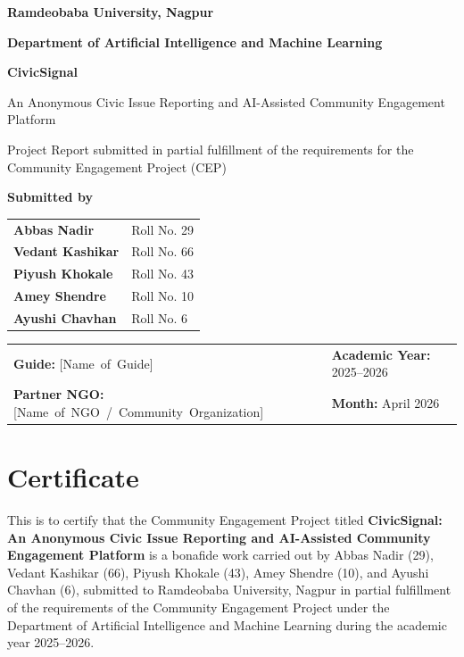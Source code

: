 \documentclass[12pt,a4paper]{report}
\newcommand{\projecttitle}{CivicSignal: An Anonymous Civic Issue Reporting and AI-Assisted Community Engagement Platform}
\newcommand{\departmentname}{Department of Artificial Intelligence and Machine Learning}
\newcommand{\institutionname}{Ramdeobaba University, Nagpur}
\newcommand{\academicyear}{2025--2026}
\newcommand{\reportmonth}{April 2026}
\begin{document}
\begin{titlepage}
  \centering
  {\Large \textbf{\institutionname} \par}
  \vspace{0.4cm}
  {\large \textbf{\departmentname} \par}
  \vspace{1.8cm}
  {\Huge \textbf{CivicSignal} \par}
  \vspace{0.4cm}
  {\Large An Anonymous Civic Issue Reporting and AI-Assisted Community Engagement Platform \par}
  \vspace{1.8cm}
  {\large Project Report submitted in partial fulfillment of the requirements for the Community Engagement Project (CEP) \par}
  \vspace{1.4cm}
  {\large \textbf{Submitted by} \par}
  \vspace{0.5cm}
  \begin{tabular}{>{\bfseries}p{8cm}p{3cm}}
    Abbas Nadir & Roll No. 29 \\
    Vedant Kashikar & Roll No. 66 \\
    Piyush Khokale & Roll No. 43 \\
    Amey Shendre & Roll No. 10 \\
    Ayushi Chavhan & Roll No. 6 \\
  \end{tabular}
  \vfill
  \begin{tabular}{p{6cm}p{6cm}}
    \textbf{Guide:} \mbox{[Name of Guide]} & \textbf{Academic Year:} \academicyear \\
    \textbf{Partner NGO:} \mbox{[Name of NGO / Community Organization]} & \textbf{Month:} \reportmonth \\
  \end{tabular}
\end{titlepage}


\chapter*{Certificate}
This is to certify that the Community Engagement Project titled \textbf{\projecttitle} is a bonafide work carried out by Abbas Nadir (29), Vedant Kashikar (66), Piyush Khokale (43), Amey Shendre (10), and Ayushi Chavhan (6), submitted to \institutionname{} in partial fulfillment of the requirements of the Community Engagement Project under the \departmentname{} during the academic year \academicyear.
\end{document}

